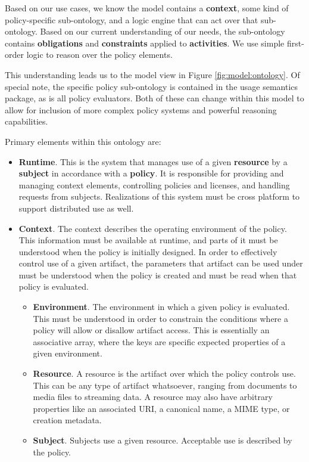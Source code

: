 Based on our use cases, we know the model contains a \textbf{context}, some kind of policy-specific sub-ontology, and a logic engine that can act over that sub-ontology.  Based on our current understanding of our needs, the sub-ontology contains \textbf{obligations} and \textbf{constraints} applied to \textbf{activities}.  We use simple first-order logic to reason over the policy elements.

This understanding leads us to the model view in Figure \ref{fig:model:ontology}.  Of special note, the specific policy sub-ontology is contained in the usage semantics package, as is all policy evaluators.  Both of these can change within this model to allow for inclusion of more complex policy systems and powerful reasoning capabilities.

Primary elements within this ontology are:
\begin{itemize}
\item \textbf{Runtime}.  This is the system that manages use of a given \textbf{resource} by a \textbf{subject} in accordance with a \textbf{policy}.  It is responsible for providing and managing context elements, controlling policies and licenses, and handling requests from subjects.  Realizations of this system must be cross platform to support distributed use as well.
\item \textbf{Context}.  The context describes the operating environment of the policy.  This information must be available at runtime, and parts of it must be understood when the policy is initially designed.  In order to effectively control use of a given artifact, the parameters that artifact can be used under must be understood when the policy is created and must be read when that policy is evaluated.
\begin{itemize}
\item \textbf{Environment}.  The environment in which a given policy is evaluated.  This must be understood in order to constrain the conditions where a policy will allow or disallow artifact access.  This is essentially an associative array, where the keys are specific expected properties of a given environment.
\item \textbf{Resource}.  A resource is the artifact over which the policy controls use.  This can be any type of artifact whatsoever, ranging from documents to media files to streaming data.  A resource may also have arbitrary properties like an associated URI, a canonical name, a MIME type, or creation metadata.
\item \textbf{Subject}.  Subjects use a given resource.  Acceptable use is described by the policy.

\end{itemize}
\end{itemize}
